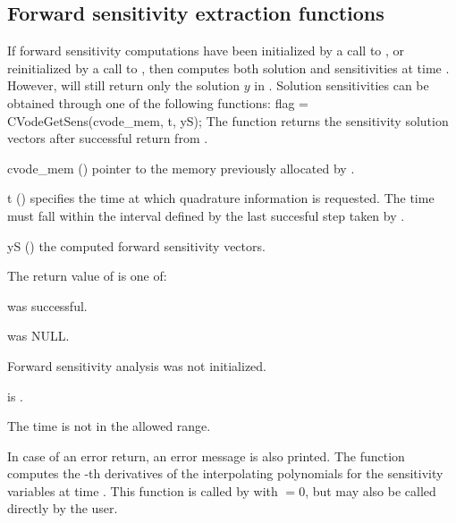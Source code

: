 
\subsection{Forward sensitivity extraction functions}\label{ss:sensi_get}

If forward sensitivity computations have been initialized by a call to ,
or reinitialized by a call to , then {\cvodes} computes both solution
and sensitivities at time . However,  will still return only the solution
$y$ in . Solution sensitivities can be obtained through one of the following functions:
{
  flag = CVodeGetSens(cvode\_mem, t, yS);
}
{
  The function  returns the sensitivity solution vectors after
  successful return from .
}
{
  \begin{args}
  \item[cvode\_mem] ()
    pointer to the memory previously allocated by .
  \item[t] ()
    specifies the time at which quadrature information is 
    requested. The time  must fall within the interval defined by the last 
    succesful step taken by {\cvodes}.
  \item[yS] ()
    the computed forward sensitivity vectors.
  \end{args}
}
{
  The return value  of  is one of:
  \begin{args}
  \item[\Id{OKAY}] 
     was successful.
  \item[\Id{CVG\_NO\_MEM}] 
     was NULL.
  \item[\Id{CVG\_NO\_SENS}] 
    Forward sensitivity analysis was not initialized.
  \item[\Id{BAD\_DKY}] 
     is .
  \item[\Id{BAD\_T}]
    The time  is not in the allowed range.
  \end{args}
}
{
  In case of an error return, an error message is also printed.  
}
The function  computes the -th derivatives of the interpolating 
polynomials for the sensitivity variables at time .
This function is called by  with  $= 0$, but may also be called 
directly by the user.
